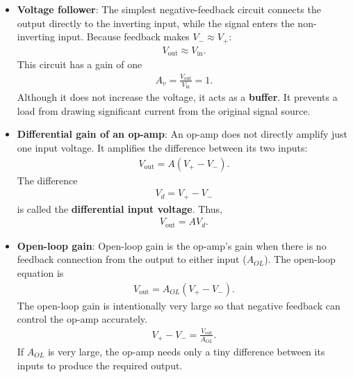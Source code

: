 \documentclass{report}
\begin{document}
\begin{itemize}
        \item \textbf{Voltage follower}: The simplest negative-feedback circuit connects the output directly to the inverting input, while the signal enters the non-inverting input.
            \bigbreak \noindent 
            Because feedback makes \(V_- \approx V_+\):
            \begin{align*}
                V_{\text{out}} \approx V_{\text{in}}
            .\end{align*}
            This circuit has a gain of one
            \begin{align*}
                A_{v} = \frac{V_{\text{out}}}{V_{\text{in}}}  = 1
            .\end{align*}
            Although it does not increase the voltage, it acts as a \textbf{buffer}. It prevents a load from drawing significant current from the original signal source.
        \item \textbf{Differential gain of an op-amp}: An op-amp does not directly amplify just one input voltage. It amplifies the difference between its two inputs:
            \begin{align*}
                V_{\text{out}} = A(V_{+} - V_{-})
            .\end{align*}
            The difference 
            \begin{align*}
                V_{d} = V_{+} - V_{-}
            \end{align*}
            is called the \textbf{differential input voltage}. Thus,
            \begin{align*}
                V_{\text{out}} = AV_{d}
            .\end{align*}
        \item \textbf{Open-loop gain}: Open-loop gain is the op-amp’s gain when there is no feedback connection from the output to either input ($A_{OL}$). The open-loop equation is
            \begin{align*}
                V_{\text{out}} = A_{OL}(V_{+} - V_{-})
            .\end{align*}
            The open-loop gain is intentionally very large so that negative feedback can control the op-amp accurately.
            \begin{align*}
                V_{+} - V_{-} = \frac{V_{\text{out}}}{A_{OL}}
            .\end{align*}
            If \(A_{OL}\) is very large, the op-amp needs only a tiny difference between its inputs to produce the required output.
            \bigbreak \noindent 

\end{itemize}
\end{document}

